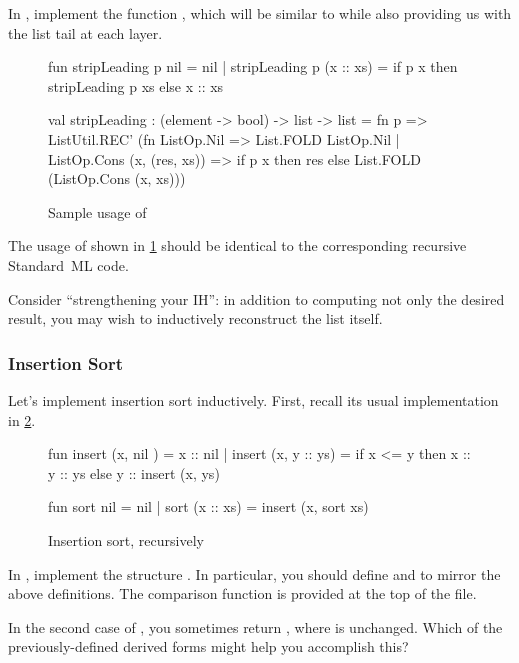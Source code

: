 \documentclass[11pt]{article}
\begin{document}
\begin{task}{10}
  In , implement the function , which will be similar to  while also providing us with the list tail at each layer.

  \begin{figure}
  \begin{codeblock}
  fun stripLeading p nil = nil
    | stripLeading p (x :: xs) =
        if p x
          then stripLeading p xs
          else x :: xs

  val stripLeading : (element -> bool) -> list -> list =
    fn p =>
      ListUtil.REC'
        (fn ListOp.Nil => List.FOLD ListOp.Nil
          | ListOp.Cons (x, (res, xs)) =>
              if p x
                then res
                else List.FOLD (ListOp.Cons (x, xs)))
  \end{codeblock}
  \caption{Sample usage of }
  \label{fig:rec'}
  \end{figure}
  The usage of  shown in \cref{fig:rec'} should be identical to the corresponding recursive Standard~ML code.
\end{task}
\begin{hint}
  Consider ``strengthening your IH'': in addition to computing not only the desired result, you may wish to inductively reconstruct the list itself.
\end{hint}

\subsubsection{Insertion Sort}

Let's implement insertion sort inductively.
First, recall its usual implementation in \cref{fig:insertion-sort}.
\begin{figure}
\begin{codeblock}
  fun insert (x, nil    ) = x :: nil
    | insert (x, y :: ys) =
        if x <= y
          then x :: y :: ys
          else y :: insert (x, ys)

  fun sort nil       = nil
    | sort (x :: xs) = insert (x, sort xs)
\end{codeblock}
\caption{Insertion sort, recursively}
\label{fig:insertion-sort}
\end{figure}

\begin{task}{20}
  In , implement the structure .
  In particular, you should define  and  to mirror the above definitions.
  The comparison function \code{<=} is provided at the top of the file.
\end{task}
\begin{hint}
  In the second case of , you sometimes return , where  is unchanged.
  Which of the previously-defined derived forms might help you accomplish this?
\end{hint}
\end{document}
